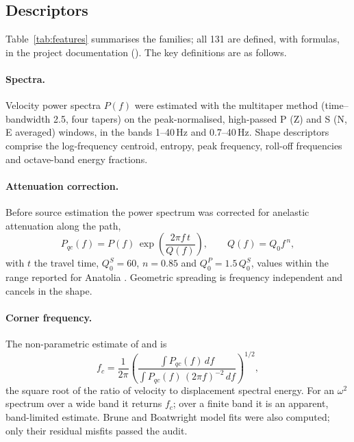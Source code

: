 \documentclass[11pt,a4paper]{article}
\newcommand{\fc}{f_c}
\newcommand{\code}[1]{\texttt{\detokenize{#1}}}
\begin{document}
\subsection{Descriptors}
Table~\ref{tab:features} summarises the families; all 131 are defined, with
formulas, in the project documentation (\code{docs/FEATURES.md}). The key
definitions are as follows.

\paragraph{Spectra.} Velocity power spectra $P(f)$ were estimated with the
multitaper method \citep{thomson1982} (time--bandwidth 2.5, four tapers) on
the peak-normalised, high-passed P (Z) and S (N, E averaged) windows, in the
bands 1--40\,Hz and 0.7--40\,Hz. Shape descriptors comprise the log-frequency
centroid, entropy, peak frequency, roll-off frequencies and octave-band energy
fractions.

\paragraph{Attenuation correction.} Before source estimation the power
spectrum was corrected for anelastic attenuation along the path,
\begin{equation}
  P_{qc}(f) = P(f)\,\exp\!\left(\frac{2\pi f\, t}{Q(f)}\right), \qquad Q(f) = Q_0 f^{\,n},
\end{equation}
with $t$ the travel time, $Q_0^S=60$, $n=0.85$ and $Q_0^P = 1.5\,Q_0^S$, values
within the range reported for Anatolia \citep{horasan2004,sertcelik2012}.
Geometric spreading is frequency independent and cancels in the shape.

\paragraph{Corner frequency.} The non-parametric estimate of
\citet{andrews1986} and \citet{snoke1987} is
\begin{equation}
  \fc = \frac{1}{2\pi}\left(\frac{\int P_{qc}(f)\,df}{\int P_{qc}(f)\,(2\pi f)^{-2}\,df}\right)^{1/2},
  \label{eq:snoke}
\end{equation}
the square root of the ratio of velocity to displacement spectral energy. For
an $\omega^{2}$ spectrum over a wide band it returns $\fc$; over a finite band it
is an apparent, band-limited estimate. Brune and Boatwright model fits were
also computed; only their residual misfits passed the audit.
\end{document}
